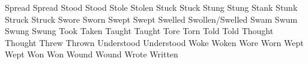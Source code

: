 	            {Spread}{}	            {Spread}{}              {}{}
	            {Stood}{}	            {Stood}{}               {}{}
	            {Stole}{}	            {Stolen}{}              {}{}
	            {Stuck}{}	            {Stuck}{}               {}{}
	            {Stung}{}	            {Stung}{}               {}{}
	            {Stank}{}	            {Stunk}{}               {}{}
	            {Struck}{}	            {Struck}{}              {}{}
	            {Swore}{}	            {Sworn}{}               {}{}
	            {Swept}{}	            {Swept}{}               {}{}
	            {Swelled}{}	            {Swollen/Swelled}{}     {}{}
	            {Swam}{}	            {Swum}{}                {}{}
	            {Swung}{}	            {Swung}{}               {}{}
	            {Took}{}	            {Taken}{}               {}{}
	            {Taught}{}	            {Taught}{}              {}{}
	            {Tore}{}	            {Torn}{}                {}{}
	            {Told}{}	            {Told}{}                {}{}
	            {Thought}{}	            {Thought}{}             {}{}
	            {Threw}{}	            {Thrown}{}              {}{}
	        {Understood}{}	        {Understood}{}          {}{}
	            {Woke}{}	            {Woken}{}               {}{}
	            {Wore}{}	            {Worn}{}                {}{}
	            {Wept}{}	            {Wept}{}                {}{}
	            {Won}{}	                {Won}{}                 {}{}
	            {Wound}{}	            {Wound}{}               {}{}
	            {Wrote}{}	            {Written}{}             {}{}